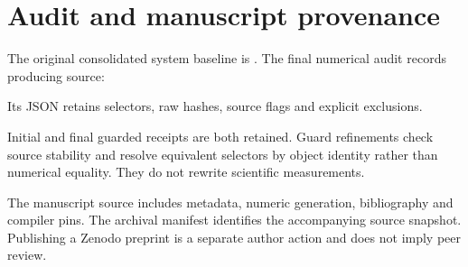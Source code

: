 \section{Audit and manuscript provenance}
The original consolidated system baseline is
.
The final numerical audit records producing source:
\begin{quote}\small\texttt{\AuditSourceCommit}\end{quote}
Its JSON retains selectors, raw hashes,
source flags and explicit exclusions.

Initial and final guarded receipts are both retained. Guard refinements check
source stability and resolve equivalent selectors by object identity rather
than numerical equality. They do not rewrite scientific measurements.

The manuscript source includes metadata, numeric generation, bibliography and
compiler pins. The archival manifest identifies the accompanying source
snapshot. Publishing a Zenodo preprint is a separate author action and does
not imply peer review.
